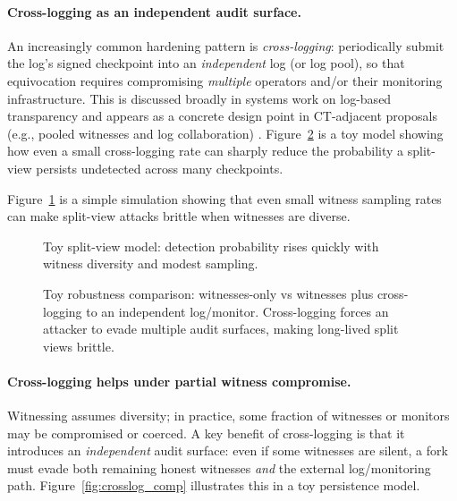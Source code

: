 \documentclass[11pt]{article}
\begin{document}
\paragraph{Cross-logging as an independent audit surface.}
An increasingly common hardening pattern is \emph{cross-logging}: periodically submit the log's signed checkpoint into an \emph{independent} log (or log pool), so that equivocation requires compromising \emph{multiple} operators and/or their monitoring infrastructure.
This is discussed broadly in systems work on log-based transparency \cite{hicks2023sok_transparency} and appears as a concrete design point in CT-adjacent proposals (e.g., pooled witnesses and log collaboration) \cite{dirksen2021logpicker}.
Figure~\ref{fig:crosslog} is a toy model showing how even a small cross-logging rate can sharply reduce the probability a split-view persists undetected across many checkpoints.

Figure~\ref{fig:split_view} is a simple simulation showing that even small witness sampling rates can make split-view attacks brittle when witnesses are diverse.

\begin{figure}[t]
\centering
{}
\caption{Toy split-view model: detection probability rises quickly with witness diversity and modest sampling.}
\label{fig:split_view}
\end{figure}

\begin{figure}[t]
\centering
{}
\caption{Toy robustness comparison: witnesses-only vs witnesses plus cross-logging to an independent log/monitor.
Cross-logging forces an attacker to evade multiple audit surfaces, making long-lived split views brittle.}
\label{fig:crosslog}
\end{figure}


\paragraph{Cross-logging helps under partial witness compromise.}
Witnessing assumes diversity; in practice, some fraction of witnesses or monitors may be compromised or coerced.
A key benefit of cross-logging is that it introduces an \emph{independent} audit surface: even if some witnesses are silent,
a fork must evade both remaining honest witnesses \emph{and} the external log/monitoring path.
Figure~\ref{fig:crosslog_comp} illustrates this in a toy persistence model.
\end{document}
